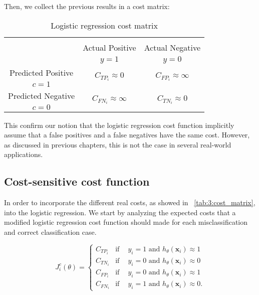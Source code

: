\noindent Then, we collect the previous results in a cost matrix:
  \begin{table}[htbp]
    \centering
    \footnotesize
    \begin{tabular}{c|c|c}
      \multicolumn{3}{c}{}\\
      \multicolumn{1}{c|}{}  & Actual Positive& Actual Negative \\
      \multicolumn{1}{c|}{} & $y=1$& $y=0$ \\
      \hline
      Predicted Positive    & \multirow{ 2}{*}{$C_{{TP}_i}\approx 0$} & 
      \multirow{2}{*}{$C_{{FP}_i}\approx \infty$} \\
      $c=1$ & &\\
      \hline
      Predicted Negative    & \multirow{ 2}{*}{$C_{{FN}_i}\approx \infty$} & \multirow{ 
      2}{*}{$C_{{TN}_i}\approx 0$} \\
      $c=0$ & &\\
    \end{tabular}
    \caption{Logistic regression cost matrix}
    \label{tab:7:1}
  \end{table} 
  
This confirm our notion that the logistic regression cost function implicitly assume that 
a false positives and a false negatives have the same cost. However, as discussed in previous 
chapters, this is not the case in several real-world applications.

  
\subsection{Cost-sensitive cost function}
\label{sec:7:cscostfunction}

In order to incorporate the different real costs, as showed in 
\tablename{~\ref{tab:3:cost_matrix}}, into the logistic regression. We start by analyzing the 
expected costs that a modified logistic regression cost function should made for each 
misclassification and correct classification case.

\begin{equation*}
  J^c_i(\theta) = 
  \begin{cases}
    C_{TP_i}    & \text{if} \phantom{-}  y_i = 1 \text{ and } h_\theta(\mathbf{x}_i) \approx 1  \\
    C_{TN_i}    & \text{if} \phantom{-}  y_i = 0 \text{ and } h_\theta(\mathbf{x}_i) \approx 0  \\
    C_{FP_i}    & \text{if} \phantom{-}  y_i = 0 \text{ and } h_\theta(\mathbf{x}_i) \approx 1  \\
    C_{FN_i}    & \text{if} \phantom{-}  y_i = 1 \text{ and } h_\theta(\mathbf{x}_i) \approx 0 .
  \end{cases}
\end{equation*}

